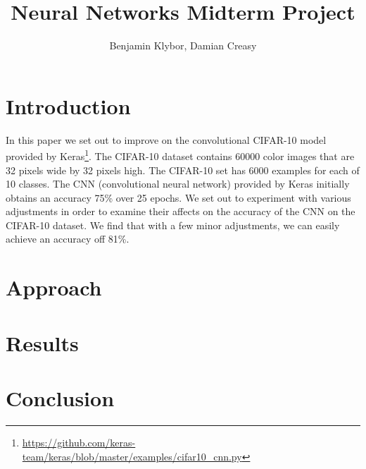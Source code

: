\documentclass{article}
\title{Neural Networks Midterm Project}
\author{Benjamin Klybor, Damian Creasy}
\begin{document}
\maketitle

\section{Introduction}
In this paper we set out to improve on the convolutional CIFAR-10 model provided by Keras\footnote{\url{https://github.com/keras-team/keras/blob/master/examples/cifar10_cnn.py}}. The CIFAR-10 dataset contains 60000 color images that are 32 pixels wide by 32 pixels high. The CIFAR-10 set has 6000 examples for each of 10 classes. The CNN (convolutional neural network) provided by Keras initially obtains an accuracy 75\% over 25 epochs. We set out to experiment with various adjustments in order to examine their affects on the accuracy of the CNN on the CIFAR-10 dataset. We find that with a few minor adjustments, we can easily achieve an accuracy off 81\%.

\section{Approach}

\section{Results}

\section{Conclusion}
\end{document}
